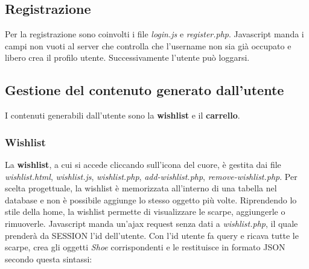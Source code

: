 \documentclass[a4paper,12pt]{article}
\begin{document}
\subsection{Registrazione}
Per la registrazione sono coinvolti i file \textit{login.js} e \textit{register.php}.
Javascript manda i campi non vuoti al server che controlla che l'username non sia già
occupato e libero crea il profilo utente. Successivamente l'utente può loggarsi.

\subsection{Gestione del contenuto generato dall'utente}
I contenuti generabili dall'utente sono la \textbf{wishlist} e il \textbf{carrello}.
\subsubsection{Wishlist}
La \textbf{wishlist}, a cui si accede cliccando sull'icona del cuore, è gestita dai file
\textit{wishlist.html}, \textit{wishlist.js}, \textit{wishlist.php}, \textit{add-wishlist.php},
\textit{remove-wishlist.php}. Per scelta progettuale, la wishlist è memorizzata all'interno di una tabella nel database
e non è possibile aggiunge lo stesso oggetto più volte.
Riprendendo lo stile della home, la wishlist permette di visualizzare le scarpe, aggiungerle o rimuoverle.
Javascript manda un'ajax request senza dati  a \textit{wishlist.php}, 
il quale prenderà da \textdollar\textunderscore SESSION l'id dell'utente.
Con l'id utente fa query e ricava tutte le scarpe, crea gli oggetti
 \textit{Shoe} corrispondenti e le restituisce in formato JSON secondo questa sintassi:
\end{document}
